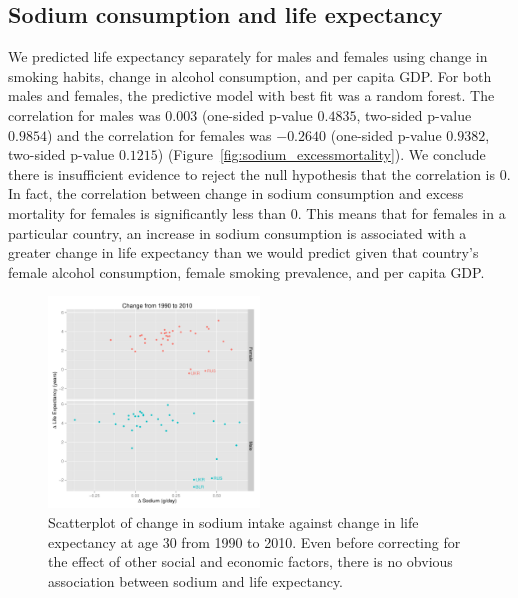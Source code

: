 \documentclass{article}
\begin{document}
\subsection{Sodium consumption and life expectancy}
We predicted life expectancy separately for males and females using change in smoking habits, change in alcohol consumption, and per capita GDP.  For both males and females, the predictive model with best fit was a random forest.  The correlation for males was $0.003$ (one-sided p-value $0.4835$, two-sided p-value $0.9854$) and the correlation for females was $-0.2640$ (one-sided p-value $0.9382$, two-sided p-value $0.1215$) (Figure~\ref{fig:sodium_excessmortality}). We conclude there is insufficient evidence to reject the null hypothesis that the correlation is $0$.  In fact, the correlation between change in sodium consumption and excess mortality for females is significantly less than $0$.  This means that for females in a particular country, an increase in sodium consumption is associated with a greater change in life expectancy than we would predict given that country's female alcohol consumption, female smoking prevalence, and per capita GDP. \\



\begin{figure}
\centering
\includegraphics[width = 0.5\textwidth]{sodium_lifeexp.pdf}
\caption{Scatterplot of change in sodium intake against change in life expectancy at age 30 from 1990 to 2010. Even before correcting for the effect of other social and economic factors, there is no obvious association between sodium and life expectancy.}\label{fig:sodium_lifeexp}
\end{figure}
\end{document}
